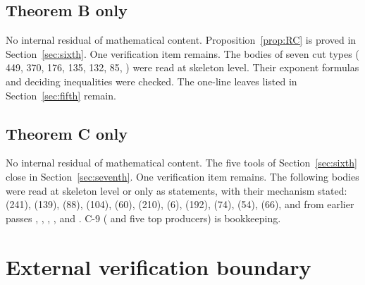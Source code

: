 \documentclass[11pt]{article}
\theoremstyle{definition}
\theoremstyle{remark}
\begin{document}
\subsection*{Theorem B only}
No internal residual of mathematical content. Proposition~\ref{prop:RC} is proved in Section~\ref{sec:sixth}. One verification item remains. The bodies of seven cut types ( 449,  370,  176,  135,  132,  85, ) were read at skeleton level. Their exponent formulas and deciding inequalities were checked. The one-line leaves listed in Section~\ref{sec:fifth} remain.

\subsection*{Theorem C only}
No internal residual of mathematical content. The five tools of Section~\ref{sec:sixth} close in Section~\ref{sec:seventh}. One verification item remains. The following bodies were read at skeleton level or only as statements, with their mechanism stated:  (241),  (139),  (88),  (104),  (60),  (210),  (6),  (192),  (74),  (54),  (66), and from earlier passes , , , ,  and . C-9 ( and five top producers) is bookkeeping.

\section{External verification boundary}
\end{document}
